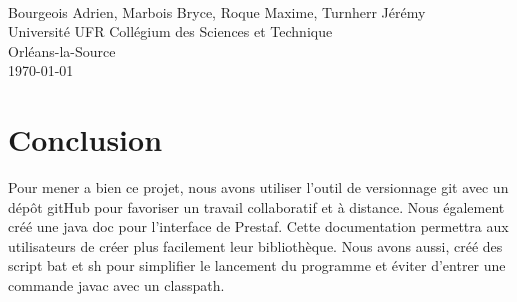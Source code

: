 \documentclass[12pt]{article}%
\begin{document}
\pagestyle{empty}

\begin{titlepage}
\begin{center}
\\
\vspace{0.5cm}
\vspace{2cm}
{\Large Bourgeois Adrien, Marbois Bryce, Roque Maxime, Turnherr Jérémy
\\Université UFR Collégium des Sciences et Technique
\\Orléans-la-Source}\\
\vfill
{\large\today}
\end{center}
\end{titlepage}

\clearpage

\tableofcontents

\cleardoublepage

\pagestyle{fancy}

























\section{Conclusion}

Pour mener a bien ce projet, nous avons utiliser l'outil de versionnage git avec un dépôt gitHub pour favoriser un travail collaboratif et à distance. Nous également créé une java doc pour l'interface de Prestaf. Cette documentation permettra aux utilisateurs de créer plus facilement leur bibliothèque. Nous avons aussi, créé des script bat et sh pour simplifier le lancement du programme et éviter d'entrer une commande javac avec un classpath.
	
\end{document}
